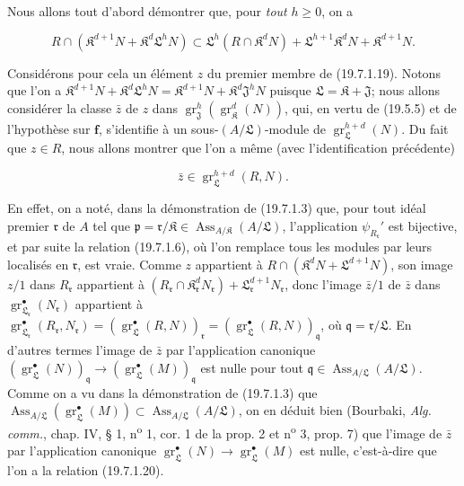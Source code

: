 Nous allons tout d'abord démontrer que, pour \emph{tout} $h\geq0$, on a
\begin{env}[19.7.1.19]
\label{IV.19.7.1.19}
\[
  R\cap(\mathfrak K^{d+1}N+\mathfrak K^d\mathfrak L^hN)\subset\mathfrak L^h(R\cap\mathfrak K^dN)+\mathfrak L^{h+1}\mathfrak K^dN+\mathfrak K^{d+1}N.
\]
\end{env}

Considérons pour cela un élément $z$ du premier membre de (19.7.1.19). Notons que l'on a $\mathfrak K^{d+1}N+\mathfrak K^d\mathfrak L^hN=\mathfrak K^{d+1}N+\mathfrak K^d\mathfrak J^hN$ puisque $\mathfrak L=\mathfrak K+\mathfrak J$; nous allons considérer la classe $\bar z$ de $z$ dans $\operatorname{gr}_{\mathfrak J}^h(\operatorname{gr}_{\mathfrak K}^d(N))$, qui, en vertu de (19.5.5) et de l'hypothèse sur $\mathbf f$, s'identifie à un sous-$(A/\mathfrak L)$-module de $\operatorname{gr}_{\mathfrak L}^{h+d}(N)$. Du fait que $z\in R$, nous allons montrer que l'on a même (avec l'identification précédente)
\begin{env}[19.7.1.20]
\label{IV.19.7.1.20}
\[
  \bar z\in\operatorname{gr}_{\mathfrak L}^{h+d}(R,N).
\]
\end{env}

En effet, on a noté, dans la démonstration de (19.7.1.3) que, pour tout idéal premier $\mathfrak r$ de $A$ tel que $\mathfrak p=\mathfrak r/\mathfrak K\in\operatorname{Ass}_{A/\mathfrak K}(A/\mathfrak L)$, l'application $\psi_{R_{\mathfrak r}}'$ est bijective, et par suite la relation (19.7.1.6), où l'on remplace tous les modules par leurs localisés en $\mathfrak r$, est vraie. Comme $z$ appartient à $R\cap(\mathfrak K^dN+\mathfrak L^{d+1}N)$, son image $z/1$ dans $R_{\mathfrak r}$ appartient à $(R_{\mathfrak r}\cap\mathfrak K_{\mathfrak r}^dN_{\mathfrak r})+\mathfrak L_{\mathfrak r}^{d+1}N_{\mathfrak r}$, donc l'image $\bar z/1$ de $\bar z$ dans $\operatorname{gr}_{\mathfrak L_{\mathfrak r}}^\bullet(N_{\mathfrak r})$ appartient à $\operatorname{gr}_{\mathfrak L_{\mathfrak r}}^\bullet(R_{\mathfrak r},N_{\mathfrak r})=(\operatorname{gr}_{\mathfrak L}^\bullet(R,N))_{\mathfrak r}=(\operatorname{gr}_{\mathfrak L}^\bullet(R,N))_{\mathfrak q}$, où $\mathfrak q=\mathfrak r/\mathfrak L$. En d'autres termes l'image de $\bar z$ par l'application canonique $(\operatorname{gr}_{\mathfrak L}^\bullet(N))_{\mathfrak q}\longrightarrow(\operatorname{gr}_{\mathfrak L}^\bullet(M))_{\mathfrak q}$ est nulle pour tout $\mathfrak q\in\operatorname{Ass}_{A/\mathfrak L}(A/\mathfrak L)$. Comme on a vu dans la démonstration de (19.7.1.3) que $\operatorname{Ass}_{A/\mathfrak L}(\operatorname{gr}_{\mathfrak L}^\bullet(M))\subset\operatorname{Ass}_{A/\mathfrak L}(A/\mathfrak L)$, on en déduit bien (Bourbaki, \emph{Alg. comm.}, chap. IV, § 1, n\textsuperscript{o} 1, cor. 1 de la prop. 2 et n\textsuperscript{o} 3, prop. 7) que l'image de $\bar z$ par l'application canonique $\operatorname{gr}_{\mathfrak L}^\bullet(N)\to\operatorname{gr}_{\mathfrak L}^\bullet(M)$ est nulle, c'est-à-dire que l'on a la relation (19.7.1.20).


